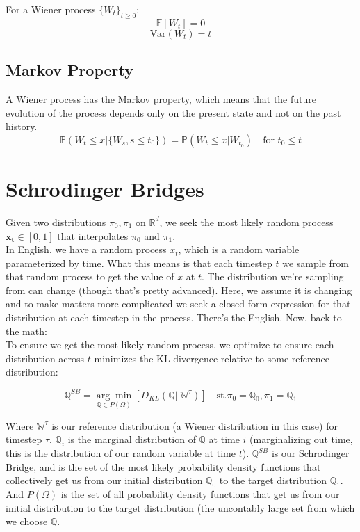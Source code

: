 \documentclass[12pt]{article}
\begin{document}
For a Wiener process \( \{W_t\}_{t \geq 0} \):
\[
\mathbb{E}[W_t] = 0
\]
\[
\text{Var}(W_t) = t
\]

\subsection{Markov Property}

A Wiener process has the Markov property, which means that the future evolution of the process depends only on the present state and not on the past history.
\[
\mathbb{P}(W_t \leq x | \{W_s, s \leq t_0\}) = \mathbb{P}(W_t \leq x | W_{t_0}) \quad \text{for } t_0 \leq t
\]



\section{Schrodinger Bridges}
Given two distributions \(\pi_0, \pi_1\) on \(\mathbb{R}^d\), we seek the most likely random process \(\mathbf{x_t} \in [0,1]\) that interpolates \(\pi_0\) and \( \pi_1\). \\

In English, we have a random process \(x_t\), which is a random variable parameterized by time. What this means is that each timestep \(t\) we sample from that random process to get the value of \(x\) at \(t\). The distribution we're sampling from can change (though that's pretty advanced). Here, we assume it is changing and to make matters more complicated we seek a closed form expression for that distribution at each timestep in the process. There's the English. Now, back to the math: \\

To ensure we get the most likely random process, we optimize to ensure each distribution across \(t\) minimizes the KL divergence relative to some reference distribution: 

\[\mathbb{Q}^{SB} = \underset{\mathbb{Q} \in P(\Omega)}{\arg\min}\left[D_{KL}(\mathbb{Q}||\mathbb{W}^{\tau})\right]\quad \text{st.} \pi_0 =\mathbb{Q}_0, \pi_1 = \mathbb{Q}_1\]

Where \(\mathbb{W}^{\tau}\) is our reference distribution (a Wiener distribution in this case) for timestep \(\tau\). \(\mathbb{Q}_i\) is the marginal distribution of \(\mathbb{Q}\) at time \(i\) (marginalizing out time, this is the distribution of our random variable at time \(t\)).   \(\mathbb{Q}^{SB}\) is our Schrodinger Bridge, and is the set of the most likely probability density functions that collectively get us from our initial distribution \(\mathbb{Q}_0\) to the target distribution \(\mathbb{Q}_1\). And \(P(\Omega)\) is the set of all probability density functions that get us from our initial distribution to the target distribution (the uncontably large set from which we choose \(\mathbb{Q}\).\\
\end{document}
